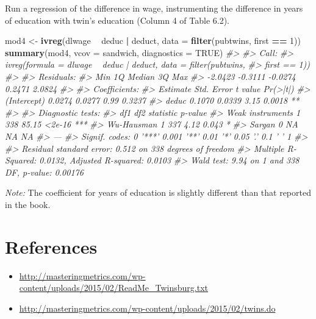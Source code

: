 \documentclass[]{book}
\newenvironment{Shaded}{\begin{snugshade}}{\end{snugshade}}
\newcommand{\CommentTok}[1]{\textcolor[rgb]{0.56,0.35,0.01}{\textit{#1}}}
\newcommand{\DataTypeTok}[1]{\textcolor[rgb]{0.13,0.29,0.53}{#1}}
\newcommand{\DecValTok}[1]{\textcolor[rgb]{0.00,0.00,0.81}{#1}}
\newcommand{\KeywordTok}[1]{\textcolor[rgb]{0.13,0.29,0.53}{\textbf{#1}}}
\newcommand{\NormalTok}[1]{#1}
\newcommand{\OperatorTok}[1]{\textcolor[rgb]{0.81,0.36,0.00}{\textbf{#1}}}
\newcommand{\OtherTok}[1]{\textcolor[rgb]{0.56,0.35,0.01}{#1}}
\newcommand{\StringTok}[1]{\textcolor[rgb]{0.31,0.60,0.02}{#1}}
\providecommand{\tightlist}{%
  \setlength{\itemsep}{0pt}\setlength{\parskip}{0pt}}
\theoremstyle{definition}
\theoremstyle{definition}
\theoremstyle{definition}
\theoremstyle{remark}
\begin{document}
Run a regression of the difference in wage, instrumenting the difference
in years of education with twin's education (Column 4 of Table 6.2).

\begin{Shaded}
\begin{Highlighting}[]
\NormalTok{mod4 <-}\StringTok{ }\KeywordTok{ivreg}\NormalTok{(dlwage }\OperatorTok{~}\StringTok{ }\NormalTok{deduc }\OperatorTok{|}\StringTok{ }\NormalTok{deduct,}
              \DataTypeTok{data =} \KeywordTok{filter}\NormalTok{(pubtwins, first }\OperatorTok{==}\StringTok{ }\DecValTok{1}\NormalTok{))}
\KeywordTok{summary}\NormalTok{(mod4, }\DataTypeTok{vcov =}\NormalTok{ sandwich, }\DataTypeTok{diagnostics =} \OtherTok{TRUE}\NormalTok{)}
\CommentTok{#> }
\CommentTok{#> Call:}
\CommentTok{#> ivreg(formula = dlwage ~ deduc | deduct, data = filter(pubtwins, }
\CommentTok{#>     first == 1))}
\CommentTok{#> }
\CommentTok{#> Residuals:}
\CommentTok{#>     Min      1Q  Median      3Q     Max }
\CommentTok{#> -2.0423 -0.3111 -0.0274  0.2471  2.0824 }
\CommentTok{#> }
\CommentTok{#> Coefficients:}
\CommentTok{#>             Estimate Std. Error t value Pr(>|t|)   }
\CommentTok{#> (Intercept)   0.0274     0.0277    0.99   0.3237   }
\CommentTok{#> deduc         0.1070     0.0339    3.15   0.0018 **}
\CommentTok{#> }
\CommentTok{#> Diagnostic tests:}
\CommentTok{#>                  df1 df2 statistic p-value    }
\CommentTok{#> Weak instruments   1 338     85.15  <2e-16 ***}
\CommentTok{#> Wu-Hausman         1 337      4.12   0.043 *  }
\CommentTok{#> Sargan             0  NA        NA      NA    }
\CommentTok{#> ---}
\CommentTok{#> Signif. codes:  0 '***' 0.001 '**' 0.01 '*' 0.05 '.' 0.1 ' ' 1}
\CommentTok{#> }
\CommentTok{#> Residual standard error: 0.512 on 338 degrees of freedom}
\CommentTok{#> Multiple R-Squared: 0.0132,  Adjusted R-squared: 0.0103 }
\CommentTok{#> Wald test: 9.94 on 1 and 338 DF,  p-value: 0.00176}
\end{Highlighting}
\end{Shaded}

\emph{Note:} The coefficient for years of education is slightly
different than that reported in the book.

\hypertarget{references-6}{%
\section*{References}\label{references-6}}

\begin{itemize}
\tightlist
\item
  \url{http://masteringmetrics.com/wp-content/uploads/2015/02/ReadMe_Twinsburg.txt}
\item
  \url{http://masteringmetrics.com/wp-content/uploads/2015/02/twins.do}
\end{itemize}
\end{document}
